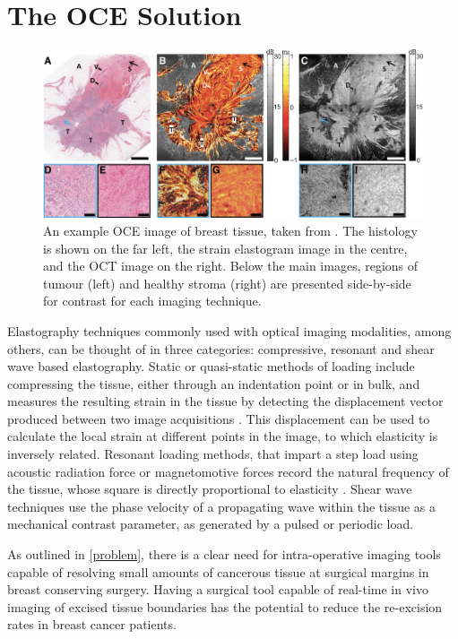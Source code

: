\section{The OCE Solution}\label{solution}
\begin{figure}
	\centering
    \includegraphics[width=\textwidth]{figures/oce_example.png}
    \caption{An example OCE image of breast tissue, taken from \cite{kennedy_investigation_2015}. The histology is shown on the far left, the strain elastogram image in the centre, and the OCT image on the right. Below the main images, regions of tumour (left) and healthy stroma (right) are presented side-by-side for contrast for each imaging technique.}
    \label{oce_example}	
\end{figure}

Elastography techniques commonly used with optical imaging modalities, among others, can be thought of in three categories: compressive, resonant and shear wave based elastography. Static or quasi-static methods of loading include compressing the tissue, either through an indentation point or in bulk, and measures the resulting strain in the tissue by detecting the displacement vector produced between two image acquisitions \cite{kennedy_optical_2014}. This displacement can be used to calculate the local strain at different points in the image, to which elasticity is inversely related. Resonant loading methods, that impart a step load using acoustic radiation force or magnetomotive forces record the natural frequency of the tissue, whose square is directly proportional to elasticity \cite{kennedy_optical_2015}. Shear wave techniques use the phase velocity of a propagating wave within the tissue as a mechanical contrast parameter, as generated by a pulsed or periodic load. 

As outlined in \autoref{problem}, there is a clear need for intra-operative imaging tools capable of resolving small amounts of cancerous tissue at surgical margins in breast conserving surgery. Having a surgical tool capable of real-time in vivo imaging of excised tissue boundaries has the potential to reduce the re-excision rates in breast cancer patients.

